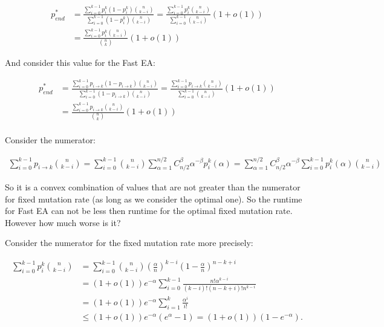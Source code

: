 \documentclass{article}
\begin{document}
\begin{align*}
  p_{end}^* &= \frac{\sum\limits_{i = 0}^{k - 1}p_i^k (1 - p_i^k) \binom{n}{k - i}}{\sum\limits_{i = 0}^{k - 1}(1 - p_i^k) \binom{n}{k - i}} = \frac{\sum\limits_{i = 0}^{k - 1}p_i^k \binom{n}{k - i}}{\sum\limits_{i = 0}^{k - 1}\binom{n}{k - i}} (1 + o(1)) \\
            &= \frac{\sum\limits_{i = 0}^{k - 1}p_i^k \binom{n}{k - i}}{\binom{n}{k}} (1 + o(1))
\end{align*}

And consider this value for the Fast EA:

\begin{align*}
  p_{end}^* &= \frac{\sum\limits_{i = 0}^{k - 1}p_{i \to k} (1 - p_{i \to k}) \binom{n}{k - i}}{\sum\limits_{i = 0}^{k - 1}(1 - p_{i \to k}) \binom{n}{k - i}} = \frac{\sum\limits_{i = 0}^{k - 1}p_{i \to k} \binom{n}{k - i}}{\sum\limits_{i = 0}^{k - 1}\binom{n}{k - i}} (1 + o(1))\\
            &= \frac{\sum\limits_{i = 0}^{k - 1}p_{i \to k} \binom{n}{k - i}}{\binom{n}{k}} (1 + o(1)) \\
\end{align*}

Consider the numerator:

\begin{align*}
  \sum\limits_{i = 0}^{k - 1}p_{i \to k} \binom{n}{k - i} = \sum\limits_{i = 0}^{k - 1} \binom{n}{k - i} \sum\limits_{\alpha = 1}^{n / 2} C_{n / 2}^\beta \alpha^{-\beta} p_i^k(\alpha) = \sum\limits_{\alpha = 1}^{n / 2} C_{n / 2}^\beta \alpha^{-\beta} \sum\limits_{i = 0}^{k - 1} p_i^k(\alpha)\binom{n}{k - i}
\end{align*}

So it is a convex combination of values that are not greater than the numerator for fixed mutation rate (as long as we consider the optimal one). So the runtime for Fast EA can not be less then runtime for the optimal fixed mutation rate. However how much worse is it?

Consider the numerator for the fixed mutation rate more precisely:

\begin{align*}
  \sum\limits_{i = 0}^{k - 1}p_i^k \binom{n}{k - i} &= \sum\limits_{i = 0}^{k - 1} \binom{n}{k - i} \left(\frac{\alpha}{n}\right)^{k - i}\left(1  - \frac{\alpha}{n}\right)^{n - k + i} \\
  &= (1 + o(1)) e^{-\alpha} \sum\limits_{i = 0}^{k - 1} \frac{n!\alpha^{k - i}}{(k - i)!(n - k + i)!n^{k - i}} \\
  &= (1 + o(1)) e^{-\alpha} \sum\limits_{i = 1}^k \frac{\alpha^i}{i!} \\
  &\le (1 + o(1))e^{-\alpha} (e^\alpha - 1) = (1 + o(1)) (1 - e^{-\alpha}).
\end{align*}
\end{document}
